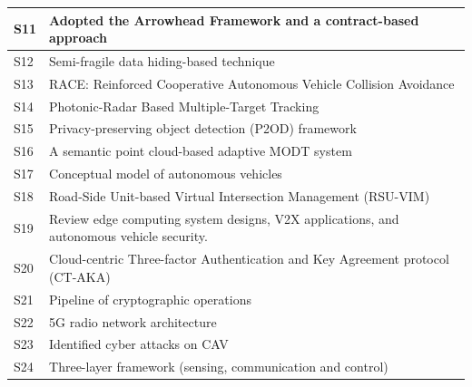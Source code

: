 \documentclass[a4paper,12pt]{article}
\begin{document}
\begin{table}[hbt!]
{\begin{tabular}{|l|l|}
S11                                                                              & Adopted the Arrowhead Framework and a contract-based approach                            \\ \hline
S12                                                                              & Semi-fragile data hiding-based technique                                                 \\ \hline
S13                                                                              & RACE: Reinforced Cooperative Autonomous Vehicle Collision Avoidance                      \\ \hline
S14                                                                              & Photonic-Radar Based Multiple-Target Tracking                                            \\ \hline
S15                                                                              & Privacy-preserving object detection (P2OD) framework                                     \\ \hline
S16                                                                              & A semantic point cloud-based adaptive MODT system                                        \\ \hline
S17                                                                              & Conceptual model of autonomous vehicles                                                  \\ \hline
S18                                                                              & Road-Side Unit-based Virtual Intersection Management (RSU-VIM)                           \\ \hline
S19                                                                              & Review edge computing system
designs, V2X applications, and autonomous vehicle security.                                             \\ \hline
S20                                                                              & Cloud-centric Three-factor Authentication and Key Agreement protocol (CT-AKA)            \\ \hline
S21                                                                              & Pipeline of cryptographic operations                                                     \\ \hline
S22                                                                              & 5G radio network architecture                                                            \\ \hline
S23                                                                              & Identified cyber attacks on CAV                                                          \\ \hline
S24                                                                              & Three-layer framework (sensing, communication and control)                               \\ \hline
\end{tabular}%
}
\end{table}
\end{document}
